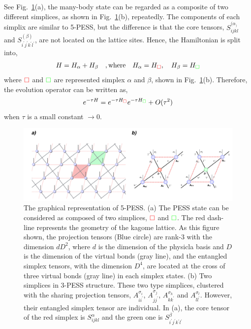 See Fig.~\ref{fig4325}(a), the many-body state can be regarded as a composite of two different simplices, as shown in Fig.~\ref{fig4325}(b), repeatedly. The components of each simplix are similar to 5-PESS, but the difference is that the core tensors, $S^{(\alpha_)}_{ijkl}$ and $S^{(\beta)}_{i^{\prime}j^{\prime}k^{\prime}l^{\prime}}$, are not located on the lattice sites. Hence, the Hamiltonian is split into,
\begin{align}
	H = H_{\alpha} + H_{\beta} \quad,\text{where} \quad H_{\alpha} = H_{\color{red} \square},\quad H_{\beta} = H_{\color{green} \square}
\end{align}
where ${\color{red} \square}$ and ${\color{green} \square}$ are represented simplex $\alpha$ and $\beta$, shown in Fig.~\ref{fig4325}(b). Therefore, the evolution operator can be written as, 
\begin{align}
	e^{-\tau H} = e^{-\tau H_{\color{red} \square}} e^{-\tau H_{ \color{green} \square}} + O(\tau^2)
\end{align}
when $\tau$ is a small constant $\rightarrow 0$.
\begin{figure}[ht]
	\centering
	\includegraphics[width=1.00\textwidth]{figures/fig4325.png}
	\caption[The graphical representation of 5-PESS]{The graphical representation of 5-PESS. (a) The PESS state can be considered as composed of two simplices, ${\color{red} \square}$ and ${\color{green} \square}$. The red dash-line represents the geometry of the kagome lattice. As this figure shown, the projection tensors (Blue circle) are rank-3 with the dimension $dD^2$, where $d$ is the dimension of the physicla basis and $D$ is the dimension of the virtual bonds (gray line), and the entangled simplex tensors, with the dimension $D^4$, are located at the cross of three virtual bonds (gray line) in each simplex states. (b) Two simplices in 3-PESS structure. These two type simplices, clustered with the sharing projection tensors, $A^{\sigma_i}_{ii^{\prime}}$, $A^{\sigma_j}_{jj^{\prime}}$, $A^{\sigma_k}_{kk^{\prime}}$ and $A^{\sigma_l}_{ll^{\prime}}$. However, their entangled simplex tensor are individual. In (a), the core tensor of the red simplex is $S^{\alpha}_{ijkl}$ and the green one is $S^{\beta}_{i^{\prime}j^{\prime}k^{\prime}l^{\prime}}$}
	\label{fig4325}
\end{figure}

